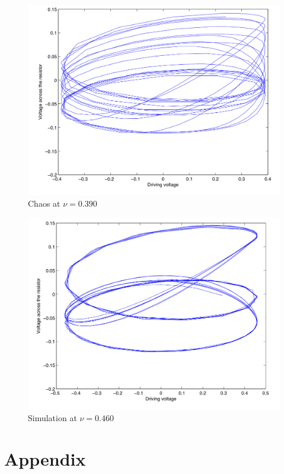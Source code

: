 \documentclass[12pt]{report}
\begin{document}
	\begin{figure}
		\centering
		\includegraphics{simulations/plotnu0390.png}
		\caption{Chaos at $\nu=0.390$}
		\label{fig:sim.0390}
	\end{figure}

	\begin{figure}
		\centering
		\includegraphics{simulations/plotnu0460.png}
		\caption{Simulation at $\nu=0.460$}
		\label{fig:sim.0460}
	\end{figure}



\chapter*{Appendix}
\end{document}
